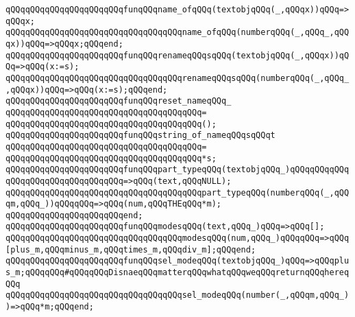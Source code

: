 \newline
\verb|qQQqqQQqqQQqqQQqqQQqqQQqfunqQQqname_ofqQQq(textobjqQQq(_,qQQqx))qQQq=>qQQqx;|\newline
\verb|qQQqqQQqqQQqqQQqqQQqqQQqqQQqqQQqqQQqname_ofqQQq(numberqQQq(_,qQQq_,qQQqx))qQQq=>qQQqx;qQQqend;|\newline
\newline
\verb|qQQqqQQqqQQqqQQqqQQqqQQqfunqQQqrenameqQQqsqQQq(textobjqQQq(_,qQQqx))qQQq=>qQQq(x:=s);|\newline
\verb|qQQqqQQqqQQqqQQqqQQqqQQqqQQqqQQqqQQqrenameqQQqsqQQq(numberqQQq(_,qQQq_,qQQqx))qQQq=>qQQq(x:=s);qQQqend;|\newline
\newline
\verb|qQQqqQQqqQQqqQQqqQQqqQQqfunqQQqreset_nameqQQq_|\newline
\verb|qQQqqQQqqQQqqQQqqQQqqQQqqQQqqQQqqQQqqQQq=|\newline
\verb|qQQqqQQqqQQqqQQqqQQqqQQqqQQqqQQqqQQqqQQq();|\newline
\newline
\verb|qQQqqQQqqQQqqQQqqQQqqQQqfunqQQqstring_of_nameqQQqsqQQqt|\newline
\verb|qQQqqQQqqQQqqQQqqQQqqQQqqQQqqQQqqQQqqQQq=|\newline
\verb|qQQqqQQqqQQqqQQqqQQqqQQqqQQqqQQqqQQqqQQq*s;|\newline
\newline
\verb|qQQqqQQqqQQqqQQqqQQqqQQqfunqQQqpart_typeqQQq(textobjqQQq_)qQQqqQQqqQQqqQQqqQQqqQQqqQQqqQQqqQQq=>qQQq(text,qQQqNULL);|\newline
\verb|qQQqqQQqqQQqqQQqqQQqqQQqqQQqqQQqqQQqqQQqpart_typeqQQq(numberqQQq(_,qQQqm,qQQq_))qQQqqQQq=>qQQq(num,qQQqTHEqQQq*m);|\newline
\verb|qQQqqQQqqQQqqQQqqQQqqQQqend;|\newline
\newline
\verb|qQQqqQQqqQQqqQQqqQQqqQQqfunqQQqmodesqQQq(text,qQQq_)qQQq=>qQQq[];|\newline
\verb|qQQqqQQqqQQqqQQqqQQqqQQqqQQqqQQqqQQqmodesqQQq(num,qQQq_)qQQqqQQq=>qQQq[plus_m,qQQqminus_m,qQQqtimes_m,qQQqdiv_m];qQQqend;|\newline
\newline
\verb|qQQqqQQqqQQqqQQqqQQqqQQqfunqQQqsel_modeqQQq(textobjqQQq_)qQQq=>qQQqplus_m;qQQqqQQq#qQQqqQQqDisnaeqQQqmatterqQQqwhatqQQqweqQQqreturnqQQqhereqQQq|\newline
\verb|qQQqqQQqqQQqqQQqqQQqqQQqqQQqqQQqqQQqsel_modeqQQq(number(_,qQQqm,qQQq_))=>qQQq*m;qQQqend;|\newline
\newline
